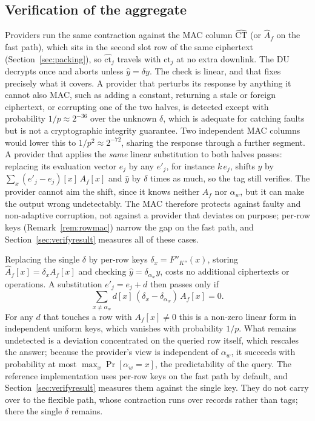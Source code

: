 \documentclass[a4paper,fleqn]{cas-dc}
\begin{document}
\subsection{Verification of the aggregate}
\label{sec:verify}
Providers run the same contraction against the MAC column
$\widehat{\text{CT}}$ (or $\widehat{A}_f$ on the fast path), which sits in the
second slot row of the same ciphertext (Section~\ref{sec:packing}), so
$\widehat{\text{ct}}_j$ travels with $\text{ct}_j$ at no extra downlink. The DU
decrypts once and aborts unless $\hat{y}=\delta y$. The check is linear, and that fixes
precisely what it covers. A provider that perturbs its response by anything it
cannot also MAC, such as adding a constant, returning a stale or foreign
ciphertext, or corrupting one of the two halves, is detected except with
probability $1/p\approx2^{-36}$ over the unknown $\delta$, which is adequate
for catching faults but is not a cryptographic integrity guarantee. Two
independent MAC columns would lower this to $1/p^2\approx2^{-72}$, sharing
the response through a further segment. A provider that applies the \emph{same}
linear substitution to both halves passes: replacing its evaluation vector
$e_j$ by any $e'_j$, for instance $k\,e_j$, shifts $y$ by
$\sum_x(e'_j-e_j)[x]\,A_f[x]$ and $\hat y$ by $\delta$ times as much, so the
tag still verifies. The provider cannot aim the shift, since it knows neither
$A_f$ nor $\alpha_w$, but it can make the output wrong undetectably. The MAC
therefore protects against faulty and non-adaptive corruption, not against a
provider that deviates on purpose; per-row keys (Remark~\ref{rem:rowmac})
narrow the gap on the fast path, and Section~\ref{sec:verifyresult} measures
all of these cases.

\begin{remark}
\label{rem:rowmac}
Replacing the single $\delta$ by per-row keys $\delta_x=F''_{K''}(x)$, storing
$\widehat{A}_f[x]=\delta_x A_f[x]$ and checking $\hat y=\delta_{\alpha_w}y$,
costs no additional ciphertexts or operations. A substitution $e'_j=e_j+d$
then passes only if
\[
\textstyle\sum_{x\neq\alpha_w}d[x]\,(\delta_x-\delta_{\alpha_w})\,A_f[x]=0 .
\]
For any $d$ that touches a row with $A_f[x]\neq 0$ this is a
non-zero linear form in independent uniform keys, which vanishes with
probability $1/p$. What remains undetected is a deviation concentrated on the
queried row itself, which rescales the answer; because the provider's view is
independent of $\alpha_w$, it succeeds with probability at most
$\max_x\Pr[\alpha_w=x]$, the predictability of the query. The reference
implementation uses per-row keys on the fast path by default, and
Section~\ref{sec:verifyresult} measures them against the single key. They do
not carry over to the flexible path, whose contraction runs over records rather
than tags; there the single $\delta$ remains.
\end{remark}
\end{document}

